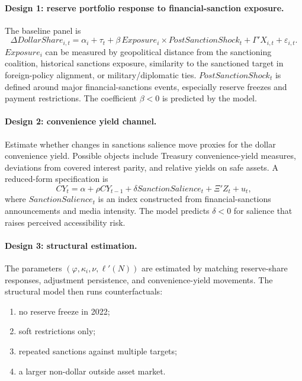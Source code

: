 \documentclass[11pt]{article}
\begin{document}
\paragraph{Design 1: reserve portfolio response to financial-sanction exposure.} The baseline panel is
\begin{equation}
\Delta DollarShare_{i,t}=\alpha_i+\tau_t+\beta\,Exposure_i\times PostSanctionShock_t+\Gamma'X_{i,t}+\varepsilon_{i,t}. \label{eq:sanction-did}
\end{equation}
$Exposure_i$ can be measured by geopolitical distance from the sanctioning coalition, historical sanctions exposure, similarity to the sanctioned target in foreign-policy alignment, or military/diplomatic ties. $PostSanctionShock_t$ is defined around major financial-sanctions events, especially reserve freezes and payment restrictions. The coefficient $\beta<0$ is predicted by the model.

\paragraph{Design 2: convenience yield channel.} Estimate whether changes in sanctions salience move proxies for the dollar convenience yield. Possible objects include Treasury convenience-yield measures, deviations from covered interest parity, and relative yields on safe assets. A reduced-form specification is
\begin{equation}
CY_t=\alpha+\rho CY_{t-1}+\delta SanctionSalience_t+\Xi'Z_t+u_t, \label{eq:convenience}
\end{equation}
where $SanctionSalience_t$ is an index constructed from financial-sanctions announcements and media intensity. The model predicts $\delta<0$ for salience that raises perceived accessibility risk.

\paragraph{Design 3: structural estimation.} The parameters $(\varphi,\kappa_i,\nu,\ell'(N))$ are estimated by matching reserve-share responses, adjustment persistence, and convenience-yield movements. The structural model then runs counterfactuals:
\begin{enumerate}[label=(\roman*)]
\item no reserve freeze in 2022;
\item soft restrictions only;
\item repeated sanctions against multiple targets;
\item a larger non-dollar outside asset market.
\end{enumerate}
\end{document}
